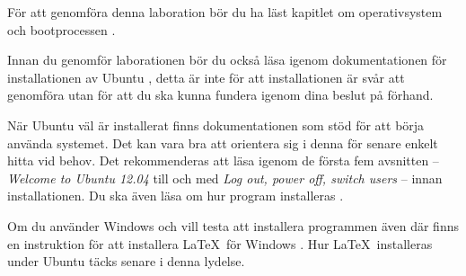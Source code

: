För att genomföra denna laboration bör du ha läst kapitlet om operativsystem 
och bootprocessen \citep[kapitel 3]{Brookshear2012csa}.

Innan du genomför laborationen bör du också läsa igenom dokumentationen för 
installationen av Ubuntu \citep{UbuntuInstall}, detta är inte för att 
installationen är svår att genomföra utan för att du ska kunna fundera igenom 
dina beslut på förhand.

När Ubuntu väl är installerat finns dokumentationen \citep{UbuntuDesktop} som 
stöd för att börja använda systemet.
Det kan vara bra att orientera sig i denna för senare enkelt hitta vid behov.
Det rekommenderas att läsa igenom de första fem avsnitten -- \emph{Welcome to 
Ubuntu 12.04} till och med \emph{Log out, power off, switch users} -- innan 
installationen.
Du ska även läsa om hur program installeras \citep[se Install additional 
software]{UbuntuDesktop}.

Om du använder Windows och vill testa att installera programmen även där finns 
en instruktion för att installera \LaTeX\ för Windows \citep{Bosk2012lui}.
Hur \LaTeX\ installeras under Ubuntu täcks senare i denna lydelse.
